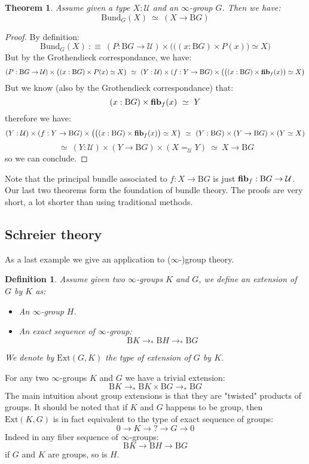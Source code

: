 \documentclass{article}
\newcommand{\sse}[1]{\medbreak \subsection{#1}}
\newcommand{\U}{{\mathcal U}}
\renewcommand{\r}{\rightarrow}
\newcommand{\fib}{\mathrm{\bf fib}}
\newcommand{\B}{\mathrm{B}}
\newtheorem{definition}{Definition}
\newtheorem{theorem}{Theorem}
\begin{document}
\begin{theorem}
Assume given a type $X:\U$ and an $\infty$-group $G$. Then we have:
\[\mathrm{Bund}_G(X)\ \simeq\ (X\r \B G)\]
\end{theorem}
\begin{proof}
By definition:
\[\mathrm{Bund}_G(X)\ :\equiv\ (P : \B G \r \U)\times \big( \big((x:\B G)\times P(x)\big) \simeq X \big)\]
But by the Grothendieck correspondance, we have:
 \[(P : \B G \r \U)\times \big((x:\B G)\times P(x) \simeq X \big) \ \simeq\ (Y:\U)\times (f:Y\r \B G) \times \big(\big((x:\B G)\times \fib_f(x)\big) \simeq X\big)\]
 But we know (also by the Grothendieck correspondance) that:  
 \[(x:\B G)\times \fib_f(x)\ \simeq\ Y\]
 therefore we have:
 \[(Y:\U)\times (f:Y\r \B G) \times \big(\big((x:\B G)\times \fib_f(x)\big) \simeq X\big) \ \simeq \ (Y:\B G)\times  (Y\r \B G)\times (Y \simeq X)\]
\[\ \simeq\ (Y:\U)\times (Y\r \B G)\times (X=_\U Y)\ \simeq \ X\r \B G\]
 so we can conclude.
\end{proof}

Note that the principal bundle associated to $f:X\r \B G$ is just $\fib_f : \B G \r \U$. Our last two theorems form the foundation of bundle theory. The proofs are very short, a lot shorter than using traditional methods. 


\sse{Schreier theory}

As a last example we give an application to ($\infty$-)group theory.

\begin{definition}
Assume given two $\infty$-groups $K$ and $G$, we define an extension of $G$ by $K$ as:
\begin{itemize}
\item An $\infty$-group $H$.
\item An exact sequence of $\infty$-group:
\[\B K \r_* \B H\r_* \B G\]
\end{itemize}
We denote by $\mathrm{Ext}(G,K)$ the type of extension of $G$ by $K$.
\end{definition}

For any two $\infty$-groups $K$ and $G$ we have a trivial extension:
\[\B K\r_* \B K\times\B G\r_*\B G\]
The main intuition about group extensions is that they are "twisted" products of groups. %
It should be noted that if $K$ and $G$ happens to be group, then $\mathrm{Ext}(K,G)$ is in fact equivalent to the type of exact sequence of groups:
\[0\r K\r ?\r G\r 0\]
Indeed in any fiber sequence of $\infty$-groups:
\[\B K \r \B H\r \B G\]
if $G$ and $K$ are groups, so is $H$.
\end{document}
